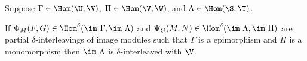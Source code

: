 %


\begin{lemma}\label{thm:interleaving_main}
  Suppose $\Gamma\in\Hom(\U,\V)$, $\Pi\in\Hom(\V,\W)$, and $\Lambda\in\Hom(\S, \T)$.

  If $\Phi_M(F, G)\in\Hom^\delta(\im~\Gamma, \im~\Lambda)$ and $\Psi_G(M, N)\in\Hom^\delta(\im~\Lambda, \im~\Pi)$ are partial $\delta$-interleavings of image modules such that $\Gamma$ is a epimorphism and $\Pi$ is a monomorphism then $\im~\Lambda$ is $\delta$-interleaved with $\V$.
\end{lemma}
